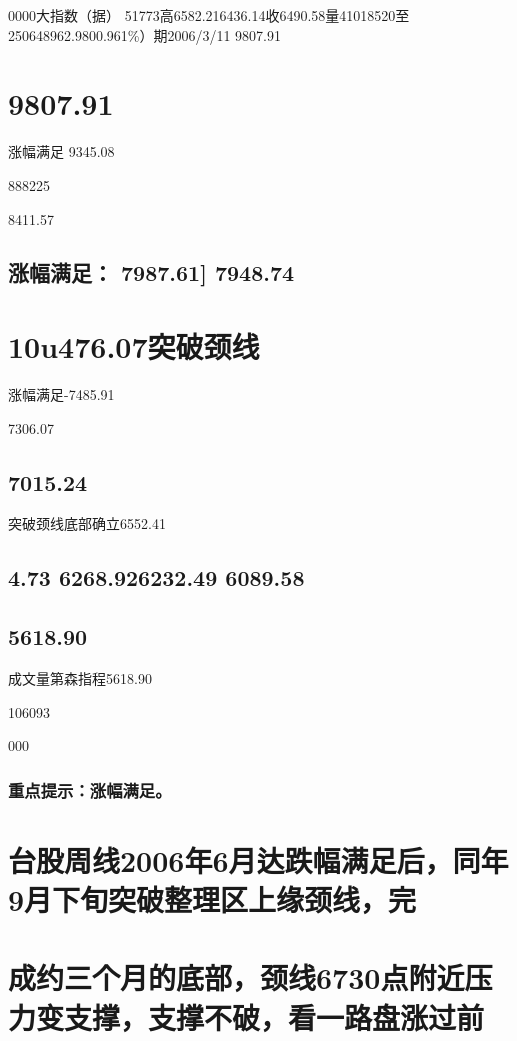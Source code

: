 \documentclass{article}
\begin{document}
0000大指数（据） 51773高6582.216436.14收6490.58量41018520至250648962.9800.961\%）期2006/3/11 9807.91

\section{9807.91}

涨幅满足 9345.08

888225

8411.57

\subsection{涨幅满足： 7987.61] 7948.74}

\section{10u476.07突破颈线}

涨幅满足-7485.91

7306.07

\subsection{7015.24}

突破颈线底部确立6552.41

\subsection{4.73 6268.926232.49 6089.58}

\subsection{5618.90}

成文量第森指程5618.90

106093

000

\subsubsection{重点提示：涨幅满足。}

\section{台股周线2006年6月达跌幅满足后，同年9月下旬突破整理区上缘颈线，完}

\section{成约三个月的底部，颈线6730点附近压力变支撑，支撑不破，看一路盘涨过前}
\end{document}
